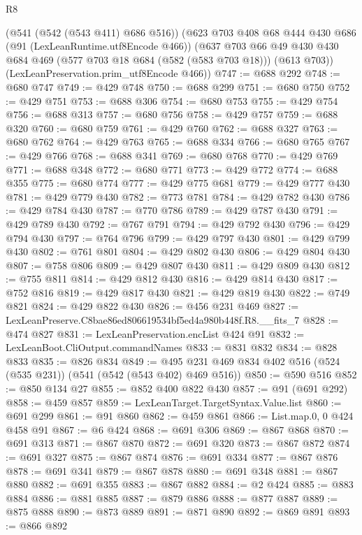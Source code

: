 \begin{lexlean}{R8}
\begin{coremodule}
    (@541 (@542 (@543 @411) @686 @516))
    (@623
      @703
      @408
      @68
      @444
      @430
      @686
      (@91 (LexLeanRuntime.utf8Encode @466))
      (@637
        @703
        @66
        @49
        @430
        @430
        @684
        @469
        (@577 @703 @18 @684 (@582 (@583 @703 @18)))
        (@613 @703))
      (LexLeanPreservation.prim_utf8Encode @466))
@747 := @688 @292
@748 := @680 @747
@749 := @429 @748
@750 := @688 @299
@751 := @680 @750
@752 := @429 @751
@753 := @688 @306
@754 := @680 @753
@755 := @429 @754
@756 := @688 @313
@757 := @680 @756
@758 := @429 @757
@759 := @688 @320
@760 := @680 @759
@761 := @429 @760
@762 := @688 @327
@763 := @680 @762
@764 := @429 @763
@765 := @688 @334
@766 := @680 @765
@767 := @429 @766
@768 := @688 @341
@769 := @680 @768
@770 := @429 @769
@771 := @688 @348
@772 := @680 @771
@773 := @429 @772
@774 := @688 @355
@775 := @680 @774
@777 := @429 @775 @681
@779 := @429 @777 @430
@781 := @429 @779 @430
@782 := @773 @781
@784 := @429 @782 @430
@786 := @429 @784 @430
@787 := @770 @786
@789 := @429 @787 @430
@791 := @429 @789 @430
@792 := @767 @791
@794 := @429 @792 @430
@796 := @429 @794 @430
@797 := @764 @796
@799 := @429 @797 @430
@801 := @429 @799 @430
@802 := @761 @801
@804 := @429 @802 @430
@806 := @429 @804 @430
@807 := @758 @806
@809 := @429 @807 @430
@811 := @429 @809 @430
@812 := @755 @811
@814 := @429 @812 @430
@816 := @429 @814 @430
@817 := @752 @816
@819 := @429 @817 @430
@821 := @429 @819 @430
@822 := @749 @821
@824 := @429 @822 @430
@826 := @456 @231 @469
@827 := LexLeanPreserve.C8bae86ed806619534bf5ed4a980b448f.R8.__fits_7
@828 := @474 @827
@831 := LexLeanPreservation.encList @424 @91
@832 := LexLeanBoot.CliOutput.commandNames
@833 := @831 @832
@834 := @828 @833
@835 := @826 @834
@849 := @495 @231 @469 @834 @402 @516 (@524 (@535 @231)) (@541 (@542 (@543 @402) @469 @516))
@850 := @590 @516
@852 := @850 @134 @27
@855 := @852 @400 @822 @430
@857 := @91 (@691 @292)
@858 := @459 @857
@859 := LexLeanTarget.TargetSyntax.Value.list
@860 := @691 @299
@861 := @91 @860
@862 := @459 @861
@866 := List.map.{0, 0} @424 @458 @91
@867 := @6 @424
@868 := @691 @306
@869 := @867 @868
@870 := @691 @313
@871 := @867 @870
@872 := @691 @320
@873 := @867 @872
@874 := @691 @327
@875 := @867 @874
@876 := @691 @334
@877 := @867 @876
@878 := @691 @341
@879 := @867 @878
@880 := @691 @348
@881 := @867 @880
@882 := @691 @355
@883 := @867 @882
@884 := @2 @424
@885 := @883 @884
@886 := @881 @885
@887 := @879 @886
@888 := @877 @887
@889 := @875 @888
@890 := @873 @889
@891 := @871 @890
@892 := @869 @891
@893 := @866 @892

\end{coremodule}
\end{lexlean}
